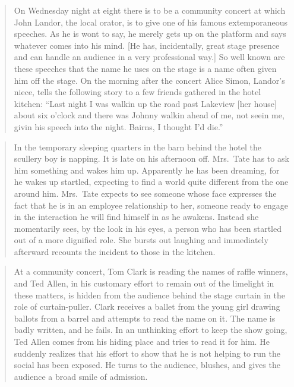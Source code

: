 \documentclass[openany,nobib]{tufte-book}
\begin{document}
\begin{quote}
On Wednesday night at eight there is to be a community concert at which
John Landor, the local orator, is to give one of his famous
extemporaneous speeches. As he is wont to say, he merely gets up on the
platform and says whatever comes into his mind. {[}He has, incidentally,
great stage presence and can handle an audience in a very professional
way.{]} So well known are these speeches that the name he uses on the
stage is a name often given him off the stage. On the morning after the
concert Alice Simon, Landor's niece, tells the following story to a few
friends gathered in the hotel kitchen: ``Last night I was walkin up the
road past Lakeview {[}her house{]} about six o'clock and there was
Johnny walkin ahead of me, not seein me, givin his speech into the
night. Bairns, I thought I'd die.''
\end{quote}

\begin{quote}
In the temporary sleeping quarters in the barn behind the hotel the
scullery boy is napping. It is late on his afternoon off. Mrs.~Tate has
to ask him something and wakes him up. Apparently he has been dreaming,
for he wakes up startled, expecting to find a world quite different from
the one around him. Mrs.~Tate expects to see someone whose face
expresses the fact that he is in an employee relationship to her,
someone ready to engage in the interaction he will find himself in as he
awakens. Instead she momentarily sees, by the look in his eyes, a person
who has been startled out of a more dignified role. She bursts out
laughing and immediately afterward recounts the incident to those in the
kitchen.
\end{quote}

\begin{quote}
At a community concert, Tom Clark is reading the names of raffle
winners, and Ted Allen, in his customary effort to remain out of the
limelight in these matters, is hidden from the audience behind the stage
curtain in the role of curtain-puller. Clark receives a ballet from the
young girl drawing ballots from a barrel and attempts to read the name
on it. The name is badly written, and he fails. In an unthinking effort
to keep the show going, Ted Allen comes from his hiding place and tries
to read it for him. He suddenly realizes that his effort to show that he
is not helping to run the social has been exposed. He turns to the
audience, blushes, and gives the audience a broad smile of admission.
\end{quote}
\end{document}
